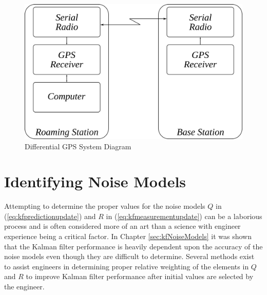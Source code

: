 \begin{figure}[ht!]
	\centering
	\includegraphics[width=.6\textwidth]{images/dgps}
	\caption{Differential GPS System Diagram}
	\label{fig:dgps}
\end{figure}

\section{Identifying Noise Models}
\label{sec:kfIdentifyNoiseModels}
Attempting to determine the proper values for the noise models $Q$ in (\ref{eq:kfpredictionupdate}) and $R$ in (\ref{eq:kfmeasurementupdate}) can be a laborious process and is often considered more of an art than a science with engineer experience being a critical factor. In Chapter \ref{sec:kfNoiseModels} it was shown that the Kalman filter performance is heavily dependent upon the accuracy of the noise models even though they are difficult to determine. Several methods exist to assist engineers in determining proper relative weighting of the elements in $Q$ and $R$ to improve Kalman filter performance after initial values are selected by the engineer.

